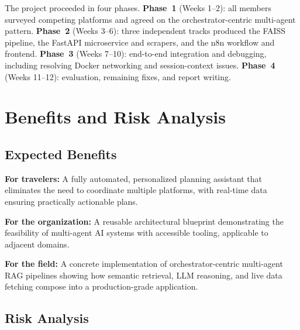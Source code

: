 \documentclass[12pt,a4paper]{report}
\begin{document}
The project proceeded in four phases. \textbf{Phase~1} (Weeks 1--2): all members surveyed competing
platforms and agreed on the orchestrator-centric multi-agent pattern. \textbf{Phase~2} (Weeks 3--6):
three independent tracks produced the FAISS pipeline, the FastAPI microservice and scrapers, and
the n8n workflow and frontend. \textbf{Phase~3} (Weeks 7--10): end-to-end integration and debugging,
including resolving Docker networking and session-context issues. \textbf{Phase~4} (Weeks 11--12):
evaluation, remaining fixes, and report writing.

\section{Benefits and Risk Analysis}

\subsection{Expected Benefits}

\textbf{For travelers:} A fully automated, personalized planning assistant that eliminates the need
to coordinate multiple platforms, with real-time data ensuring practically actionable plans.

\textbf{For the organization:} A reusable architectural blueprint demonstrating the feasibility of
multi-agent AI systems with accessible tooling, applicable to adjacent domains.

\textbf{For the field:} A concrete implementation of orchestrator-centric multi-agent RAG pipelines
showing how semantic retrieval, LLM reasoning, and live data fetching compose into a production-grade
application.

\subsection{Risk Analysis}
\end{document}
